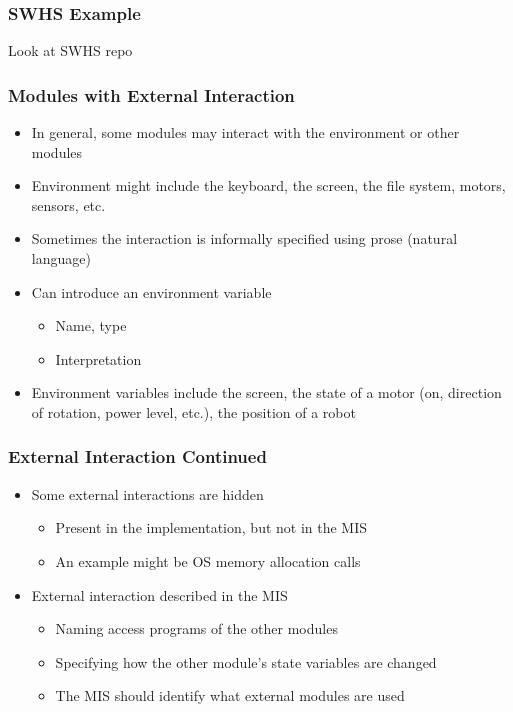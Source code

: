 \documentclass[t,12pt,numbers,fleqn]{beamer}
\begin{document}

\begin{frame}

\frametitle{SWHS Example}

Look at SWHS repo

\end{frame}


\begin{frame}
\frametitle{Modules with External Interaction}

\begin{itemize}
\item In general, some modules may interact with the environment or other modules
\item Environment might include the keyboard, the screen, the file system, motors, sensors, etc.
\item Sometimes the interaction is informally specified using prose (natural language)
\item Can introduce an environment variable
\begin{itemize}
\item Name, type
\item Interpretation
\end{itemize}
\item Environment variables include the screen, the state of a motor (on, direction of rotation, power level, etc.),
the position of a robot

\end{itemize}

\end{frame}


\begin{frame}
\frametitle{External Interaction Continued}

\begin{itemize}
\item Some external interactions are hidden
\begin{itemize}
\item Present in the implementation, but not in the MIS
\item An example might be OS memory allocation calls
\end{itemize}
\item External interaction described in the MIS
\begin{itemize}
\item Naming access programs of the other modules
\item Specifying how the other module's state variables are changed
\item The MIS should identify what external modules are used
\end{itemize}
\end{itemize}

\end{frame}
\end{document}
